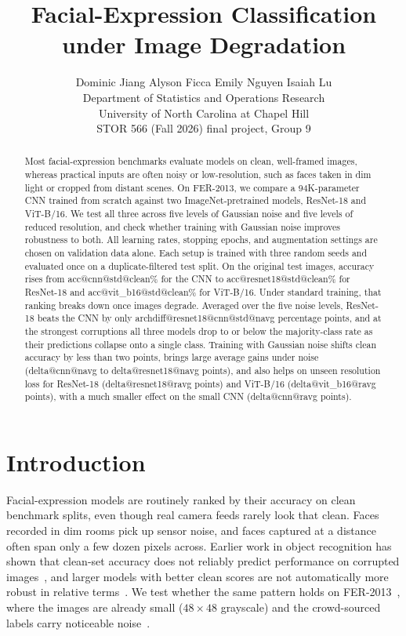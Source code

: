 \documentclass{article}
\title{Facial-Expression Classification under Image Degradation}
\author{%
  Dominic Jiang \And Alyson Ficca \And Emily Nguyen \And Isaiah Lu \\[2pt]
  \AND
  Department of Statistics and Operations Research \\
  University of North Carolina at Chapel Hill \\
  STOR 566 (Fall 2026) final project, Group 9
}
\begin{document}
\maketitle

\begin{abstract}
Most facial-expression benchmarks evaluate models on clean, well-framed images, whereas practical inputs are often noisy
or low-resolution, such as faces taken in dim light or cropped from distant scenes. On FER-2013, we compare a
94K-parameter CNN trained from scratch against two ImageNet-pretrained models, ResNet-18 and ViT-B/16. We test all three
across five levels of Gaussian noise and five levels of reduced resolution, and check whether training with Gaussian
noise improves robustness to both. All learning rates, stopping epochs, and augmentation settings are chosen on
validation data alone. Each setup is trained with three random seeds and evaluated once on a duplicate-filtered test
split. On the original test images, accuracy rises from \num{acc@cnn@std@clean}\% for the CNN to
\num{acc@resnet18@std@clean}\% for ResNet-18 and \num{acc@vit_b16@std@clean}\% for ViT-B/16. Under standard training,
that ranking breaks down once images degrade. Averaged over the five noise levels, ResNet-18 beats the CNN by only
\num{archdiff@resnet18@cnn@std@navg} percentage points, and at the strongest corruptions all three models drop to or below
the majority-class rate as their predictions collapse onto a single class. Training with Gaussian noise shifts clean
accuracy by less than two points, brings large average gains under noise (\num{delta@cnn@navg} to
\num{delta@resnet18@navg} points), and also helps on unseen resolution loss for ResNet-18 (\num{delta@resnet18@ravg}
points) and ViT-B/16 (\num{delta@vit_b16@ravg} points), with a much smaller effect on the small CNN
(\num{delta@cnn@ravg} points).
\end{abstract}

\section{Introduction}
\label{sec:intro}

Facial-expression models are routinely ranked by their accuracy on clean benchmark splits, even though real camera feeds
rarely look that clean. Faces recorded in dim rooms pick up sensor noise, and faces captured at a distance often span
only a few dozen pixels across. Earlier work in object recognition has shown that clean-set accuracy does not reliably
predict performance on corrupted images~\cite{dodge2016quality,hendrycks2019benchmarking}, and larger models with better
clean scores are not automatically more robust in relative terms~\cite{hendrycks2019benchmarking}. We test whether the
same pattern holds on FER-2013~\cite{goodfellow2013challenges}, where the images are already small ($48{\times}48$
grayscale) and the crowd-sourced labels carry noticeable noise~\cite{barsoum2016ferplus}.
\end{document}
